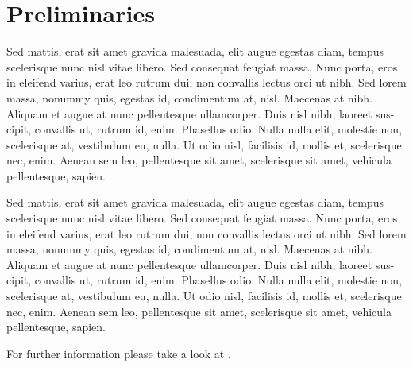 \section{Preliminaries}

Sed mattis, erat sit amet gravida malesuada, elit augue egestas diam, tempus scelerisque nunc nisl vitae libero. Sed consequat feugiat massa. Nunc porta, eros in eleifend varius, erat leo rutrum dui, non convallis lectus orci ut nibh. Sed lorem massa, nonummy quis, egestas id, condimentum at, nisl. Maecenas at nibh. Aliquam et augue at nunc pellentesque ullamcorper. Duis nisl nibh, laoreet sus- cipit, convallis ut, rutrum id, enim. Phasellus odio. Nulla nulla elit, molestie non, scelerisque at, vestibulum eu, nulla. Ut odio nisl, facilisis id, mollis et, scelerisque nec, enim. Aenean sem leo, pellentesque sit amet, scelerisque sit amet, vehicula pellentesque, sapien.

\begin{definition}
	Sed mattis, erat sit amet gravida malesuada, elit augue egestas diam, tempus scelerisque nunc nisl vitae libero. Sed consequat feugiat massa. Nunc porta, eros in eleifend varius, erat leo rutrum dui, non convallis lectus orci ut nibh. Sed lorem massa, nonummy quis, egestas id, condimentum at, nisl. Maecenas at nibh. Aliquam et augue at nunc pellentesque ullamcorper. Duis nisl nibh, laoreet sus- cipit, convallis ut, rutrum id, enim. Phasellus odio. Nulla nulla elit, molestie non, scelerisque at, vestibulum eu, nulla. Ut odio nisl, facilisis id, mollis et, scelerisque nec, enim. Aenean sem leo, pellentesque sit amet, scelerisque sit amet, vehicula pellentesque, sapien.
\end{definition}

For further information please take a look  at \cite{foo:bar}.
